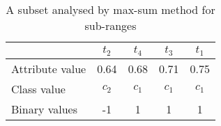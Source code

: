 \begin{table}[h]
\caption{A subset analysed by max-sum method for sub-ranges}
\label{table:table2_4}
\centering
\begin{tabular}{lcccc}
	\toprule
	\textbf{} & \textbf{$\mathit{t_2}$}   & \textbf{$\mathit{t_4}$} & \textbf{$\mathit{t_3}$} & \textbf{$\mathit{t_1}$} \\
	\midrule
	Attribute value & 0.64 & 0.68 & 0.71 & 0.75 \\
	Class value & ${c_2}$ & ${c_1}$ & ${c_1}$ & ${c_1}$ \\
	Binary values & -1 & 1 & 1 & 1 \\
	\bottomrule
\end{tabular} 
\end{table}
